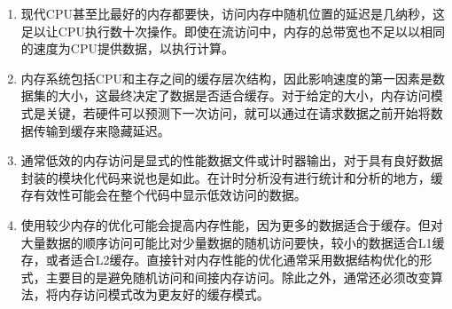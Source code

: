 \begin{enumerate}
\item 
现代CPU甚至比最好的内存都要快，访问内存中随机位置的延迟是几纳秒，这足以让CPU执行数十次操作。即使在流访问中，内存的总带宽也不足以以相同的速度为CPU提供数据，以执行计算。

\item 
内存系统包括CPU和主存之间的缓存层次结构，因此影响速度的第一因素是数据集的大小，这最终决定了数据是否适合缓存。对于给定的大小，内存访问模式是关键，若硬件可以预测下一次访问，就可以通过在请求数据之前开始将数据传输到缓存来隐藏延迟。

\item 
通常低效的内存访问是显式的性能数据文件或计时器输出，对于具有良好数据封装的模块化代码来说也是如此。在计时分析没有进行统计和分析的地方，缓存有效性可能会在整个代码中显示低效访问的数据。

\item
使用较少内存的优化可能会提高内存性能，因为更多的数据适合于缓存。但对大量数据的顺序访问可能比对少量数据的随机访问要快，较小的数据适合L1缓存，或者适合L2缓存。直接针对内存性能的优化通常采用数据结构优化的形式，主要目的是避免随机访问和间接内存访问。除此之外，通常还必须改变算法，将内存访问模式改为更友好的缓存模式。

\end{enumerate}